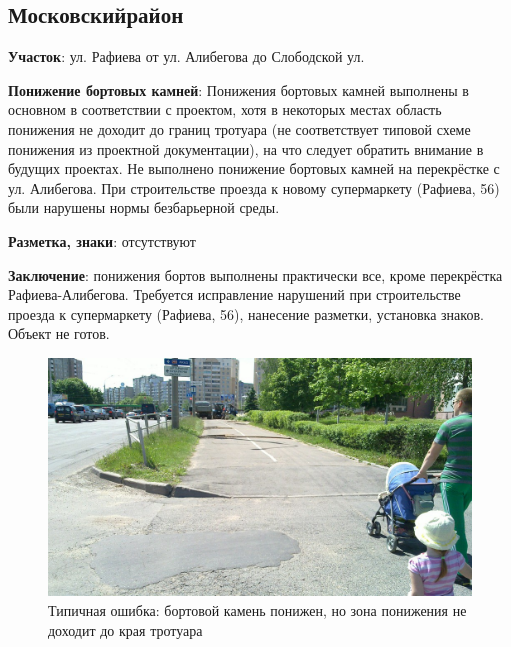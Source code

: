 \documentclass[a4paper,14pt,twoside]{extarticle}
\renewcommand\emph[1]{\textbf{#1}}
\begin{document}
\clearpage
\newpage

\subsection*{Московскийрайон}%
\emph{Участок}: ул. Рафиева от ул. Алибегова до Слободской ул.

\emph{Понижение бортовых камней}:
Понижения бортовых камней выполнены в основном в соответствии с проектом, хотя в некоторых местах область понижения не доходит до границ тротуара (не соответствует типовой схеме понижения из проектной документации), на что следует обратить внимание в будущих проектах. Не выполнено понижение бортовых камней на перекрёстке с ул. Алибегова. При строительстве проезда к новому супермаркету (Рафиева, 56) были нарушены нормы безбарьерной среды.

\emph{Разметка, знаки}: отсутствуют

\emph{Заключение}: понижения бортов выполнены практически все, кроме перекрёстка Рафиева-Алибегова. Требуется исправление нарушений при строительстве проезда к супермаркету (Рафиева, 56), нанесение разметки, установка знаков. Объект не готов.

\begin{figure}[h!]
    \centering
    \includegraphics[width=\textwidth]{Pictures/1000000000000A00000005A0F05C02E6.jpg}
    \caption{Типичная ошибка: бортовой камень понижен, но зона понижения не доходит до края тротуара}
\end{figure}
\end{document}
